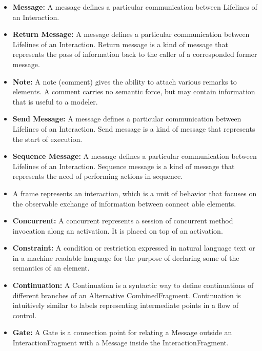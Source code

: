 \begin{itemize}
	\item \textbf{Message:} A message defines a particular communication between Lifelines of an Interaction.
	
	\item \textbf{Return Message:} A message defines a particular communication between Lifelines of an Interaction. Return message is a kind of message that represents the pass of information back to the caller of a corresponded former message.
	
	\item \textbf{Note:} A note (comment) gives the ability to attach various remarks to elements. A comment carries no semantic force, but may contain information that is useful to a modeler.
	
	\item \textbf{Send Message:} A message defines a particular communication between Lifelines of an Interaction. Send message is a kind of message that represents the start of execution.
	
	\item \textbf{Sequence Message:} A message defines a particular communication between Lifelines of an Interaction. Sequence message is a kind of message that represents the need of performing actions in sequence.
	
	\item {} A frame represents an interaction, which is a unit of behavior that focuses on the observable exchange of information between connect able elements.
	
	\item \textbf{Concurrent:} A concurrent represents a session of concurrent method invocation along an activation. It is placed on top of an activation.
	
	\item \textbf{Constraint:} A condition or restriction expressed in natural language text or in a machine readable language for the purpose of declaring some of the semantics of an element.
	
	\item \textbf{Continuation:} A Continuation is a syntactic way to define continuations of different branches of an Alternative CombinedFragment. Continuation is intuitively similar to labels representing intermediate points in a flow of control.
	
	\item \textbf{Gate:} A Gate is a connection point for relating a Message outside an InteractionFragment with a Message inside the InteractionFragment.
	

\end{itemize}
